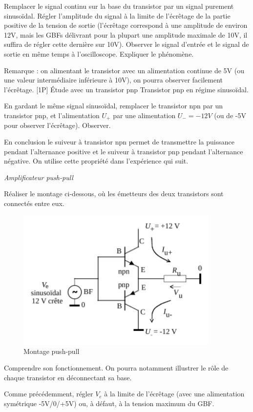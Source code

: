 \documentclass{article}%
\begin{document}
Remplacer le signal continu sur la base du transistor par un signal purement sinusoïdal. Régler l'amplitude du signal à la limite de l'écrêtage de la partie positive de la tension de sortie (l'écrêtage correspond à une amplitude de environ 12V, mais les GBFs délivrant pour la plupart une amplitude maximale de 10V, il suffira de régler cette dernière sur 10V). Observer le signal d'entrée et le signal de sortie en même temps à l'oscilloscope. Expliquer le phénomène.


Remarque : on alimentant le transistor avec un alimentation continue de 5V (ou une valeur intermédiaire inférieure à 10V), on pourra observer facilement l'écrêtage.
[1P] Étude avec un transistor pnp
Transistor pnp en régime sinusoïdal.


En gardant le même signal sinusoïdal, remplacer le transistor npn par un transistor pnp, et l'alimentation $U_{+}$ par une alimentation $U_{-} = -12V$ (ou de -5V pour observer l'écrêtage). Observer.

En conclusion le suiveur à transistor npn permet de transmettre la puissance pendant l'alternance positive et le suiveur à transistor pnp pendant l'alternance négative. On utilise cette propriété dans l'expérience qui suit. 

\textit{Amplificateur push-pull}

Réaliser le montage ci-dessous, où les émetteurs des deux transistors sont connectés entre eux.
\begin{figure}
	\centerline{\includegraphics[width=10cm]{images-exp/Transistor_pushpull.png}}
	\caption{Montage push-pull}
\end{figure}

Comprendre son fonctionnement. On pourra notamment illustrer le rôle de chaque transistor en déconnectant sa base.

Comme précédemment, régler $V_{e}$ à la limite de l'écrêtage (avec une alimentation symétrique -5V/0/+5V) ou, à défaut, à la tension maximum du GBF.
\end{document}
